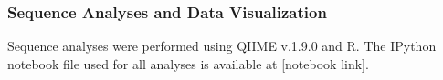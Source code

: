 \subsubsection{Sequence Analyses and Data Visualization}
Sequence analyses were performed using QIIME v.1.9.0 and R.  The IPython notebook file used for all analyses is available at [notebook link].

    